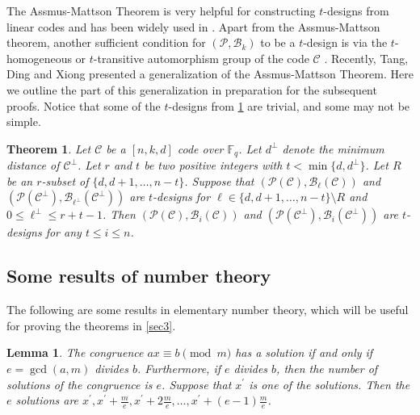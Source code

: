 \documentclass[sn-mathphys-num]{sn-jnl}%
\theoremstyle{thmstyleone}%
\newtheorem{theorem}{Theorem}%
\newtheorem{lemma}{Lemma}
\theoremstyle{thmstyletwo}%
\theoremstyle{thmstylethree}%
\begin{document}
The Assmus-Mattson Theorem is very helpful for constructing $t$-designs from linear codes and has been widely used in \cite{Ding2018DesignsLinearCodes,Ding2020InfiniteFamiliesMDS,Tonchev1998CodesDesigns,Tonchev2007Codes,Heng2022ConstructionsMDSNear}. Apart from the Assmus-Mattson theorem, another sufficient condition for $(\mathcal{P},\mathcal{B}_k)$ to be a $t$-design is via the $t$-homogeneous or $t$-transitive automorphism group of the code $\mathcal{C}$ \cite[p. 308]{Huffman2003FundamentalErrorCodes}. Recently, Tang, Ding and Xiong \cite{Tang2020CodesDifferentiallyUniform} presented a generalization of the Assmus-Mattson Theorem. Here we outline the part of this generalization in preparation for the subsequent proofs. Notice that some of the $t$-designs from \cref{sec1 thm2} are trivial, and some may not be simple.
\begin{theorem}\cite[Theorem~5.3]{Tang2020CodesDifferentiallyUniform}
	\label{sec1 thm2}
	Let $\mathcal{C}$ be a $[n,k,d]$ code over $\mathbb{F}_q$. Let $d^\perp$ denote the minimum distance of $\mathcal{C}^\perp$. Let $r$ and $t$ be two positive integers with $t<\min\{d,d^\perp\}$. Let $R$ be an $r$-subset of $\{d,d+1,\dots,n-t\}$. Suppose that $(\mathcal{P}(\mathcal{C}),\mathcal{B}_{\ell}(\mathcal{C}))$ and $(\mathcal{P}(\mathcal{C}^\perp),\mathcal{B}_{\ell^\perp}(\mathcal{C}^\perp))$ are $t$-designs for $\ell\in\{d,d+1,\dots,n-t\}\setminus R$ and $0\le\ell^\perp\le r+t-1$. Then $(\mathcal{P}(\mathcal{C}),\mathcal{B}_i(\mathcal{C}))$ and $(\mathcal{P}(\mathcal{C}^\perp),\mathcal{B}_i(\mathcal{C}^\perp))$ are $t$-designs for any $t\le i\le n$.
\end{theorem}

\subsection{Some results of number theory}

The following are some results in elementary number theory, which will be useful for proving the theorems in \cref{sec3}.

\begin{lemma}
	\label{sec2.2 lem1}
	The congruence $ax \equiv b \pmod m$ has a solution if and only if $e=\gcd(a, m)$ divides $b$. Furthermore, if $e$ divides $b$, then the number of solutions of the congruence is $e$. Suppose that $x^\prime$ is one of the solutions. Then the $e$ solutions are $x^\prime, x^\prime+\frac{m}{e}, x^\prime+2\frac{m}{e},\dots,x^\prime+(e-1)\frac{m}{e}$.
\end{lemma}
\end{document}
